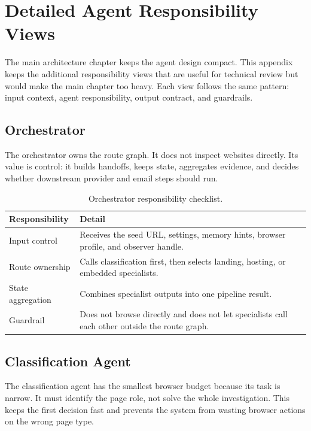 \chapter{Detailed Agent Responsibility Views}
\label{app:agent-responsibilities}

The main architecture chapter keeps the agent design compact. This appendix
keeps the additional responsibility views that are useful for technical review
but would make the main chapter too heavy. Each view follows the same pattern:
input context, agent responsibility, output contract, and guardrails.

\section{Orchestrator}

The orchestrator owns the route graph. It does not inspect websites directly.
Its value is control: it builds handoffs, keeps state, aggregates evidence, and
decides whether downstream provider and email steps should run.



\begin{table}[!htbp]
\centering
\begin{tabularx}{\textwidth}{Q{3.5cm}Y}
\toprule
{}
Responsibility & Detail \\
\midrule
Input control & Receives the seed URL, settings, memory hints, browser profile,
and observer handle. \\
Route ownership & Calls classification first, then selects landing, hosting, or
embedded specialists. \\
State aggregation & Combines specialist outputs into one pipeline result. \\
Guardrail & Does not browse directly and does not let specialists call each
other outside the route graph. \\
\bottomrule
\end{tabularx}
\caption{Orchestrator responsibility checklist.}
\label{tab:appendix-orchestrator-checklist}
\end{table}

\section{Classification Agent}

The classification agent has the smallest browser budget because its task is
narrow. It must identify the page role, not solve the whole investigation. This
keeps the first decision fast and prevents the system from wasting browser
actions on the wrong page type.

